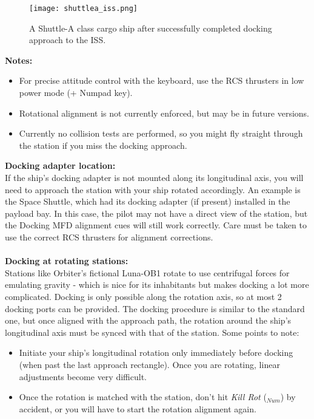 \documentclass[Orbiter User Manual.tex]{subfiles}
\begin{document}
\begin{figure}[H]
	\centering
	\texttt{[image: shuttlea\_iss.png]}
	\caption{A Shuttle-A class cargo ship after successfully completed docking approach to the ISS.}
\end{figure}

\noindent
\textbf{Notes:}

\begin{itemize}
\item For precise attitude control with the keyboard, use the RCS thrusters in low power mode (\Ctrl + Numpad key).
\item Rotational alignment is not currently enforced, but may be in future versions.
\item Currently no collision tests are performed, so you might fly straight through the station if you miss the docking approach.
\end{itemize}

\noindent
\textbf{Docking adapter location:}\\
If the ship's docking adapter is not mounted along its longitudinal axis, you will need to approach the station with your ship rotated accordingly. An example is the Space Shuttle, which had its docking adapter (if present) installed in the payload bay. In this case, the pilot may not have a direct view of the station, but the Docking MFD alignment cues will still work correctly. Care must be taken to use the correct RCS thrusters for alignment corrections.\\
\\
\textbf{Docking at rotating stations:}\\
Stations like Orbiter's fictional Luna-OB1 rotate to use centrifugal forces for emulating gravity - which is nice for its inhabitants but makes docking a lot more complicated. Docking is only possible along the rotation axis, so at most 2 docking ports can be provided. The docking procedure is similar to the standard one, but once aligned with the approach path, the rotation around the ship's longitudinal axis must be synced with that of the station. Some points to note:

\begin{itemize}
\item Initiate your ship's longitudinal rotation only immediately before docking (when past the last approach rectangle). Once you are rotating, linear adjustments become very difficult.
\item Once the rotation is matched with the station, don't hit \textit{Kill Rot} ($_{Num}$) by accident, or you will have to start the rotation alignment again.
\end{itemize}
\end{document}
